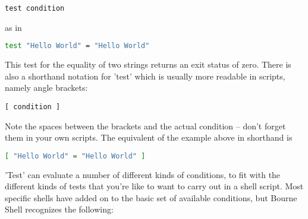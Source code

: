 \scriptsize
\begin{verbatim}
test condition
\end{verbatim}
\normalsize

as in 
\lstset{basicstyle=\scriptsize, numbers=left, captionpos=b, tabsize=4}
\begin{lstlisting}[caption=A test for string equality,language={bash},
breaklines=true,xleftmargin=15pt,label=lst:A test for string equality]
test "Hello World" = "Hello World"
\end{lstlisting}

This test for the equality of two strings returns an exit status of zero. There
is also a shorthand notation for 'test' which is usually more readable in
scripts, namely angle brackets:
\scriptsize
\begin{verbatim}
[ condition ]
\end{verbatim}
\normalsize

Note the spaces between the brackets and the actual condition -- don't forget
them in your own scripts. The equivalent of the example above in shorthand is 
\lstset{basicstyle=\scriptsize, numbers=left, captionpos=b, tabsize=4}
\begin{lstlisting}[caption=A shorter test for string equality,language={bash},
breaklines=true,xleftmargin=15pt,label=lst:A shorter test for string equality]
[ "Hello World" = "Hello World" ]
\end{lstlisting}

'Test' can evaluate a number of different kinds of conditions, to fit with the
different kinds of tests that you're like to want to carry out in a shell
script. Most specific shells have added on to the basic set of available
conditions, but Bourne Shell recognizes the following:

